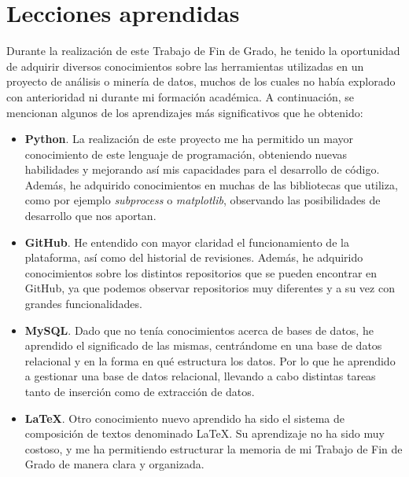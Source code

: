 \documentclass[a4paper, 12pt]{book}
\begin{document}
\section{Lecciones aprendidas}
\label{sec:lecciones_aprendidas}

Durante la realización de este Trabajo de Fin de Grado, he tenido la oportunidad de adquirir diversos conocimientos sobre las herramientas utilizadas en un proyecto de análisis o minería
de datos, muchos de los cuales no había explorado con anterioridad ni durante mi formación académica. A continuación, se mencionan algunos de los aprendizajes más significativos que he
obtenido:

\begin{itemize}
  \item \textbf{Python}. La realización de este proyecto me ha permitido un mayor conocimiento de este lenguaje de programación, obteniendo nuevas habilidades
  y mejorando así mis capacidades para el desarrollo de código. Además, he adquirido conocimientos en muchas de las bibliotecas que utiliza, como por ejemplo \textit{subprocess} o
  \textit{matplotlib}, observando las posibilidades de desarrollo que nos aportan.
  \item \textbf{GitHub}. He entendido con mayor claridad el funcionamiento de la plataforma, así como del historial de revisiones. Además, he adquirido conocimientos
  sobre los distintos repositorios que se pueden encontrar en GitHub, ya que podemos observar repositorios muy diferentes y a su vez con grandes funcionalidades.
  \item \textbf{MySQL}. Dado que no tenía conocimientos acerca de bases de datos, he aprendido el significado de las mismas, centrándome en una base de datos relacional y
  en la forma en qué estructura los datos. Por lo que he aprendido a gestionar una base de datos relacional, llevando a cabo distintas tareas tanto de inserción como de
  extracción de datos.
  \item \textbf{LaTeX}. Otro conocimiento nuevo aprendido ha sido el sistema de composición de textos denominado LaTeX. Su aprendizaje no ha sido muy costoso, y me ha permitiendo
  estructurar la memoria de mi Trabajo de Fin de Grado de manera clara y organizada.
\end{itemize}
\end{document}
